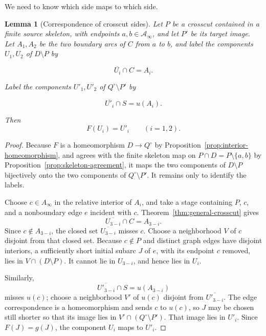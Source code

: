 \documentclass[11pt]{article}
\theoremstyle{mainplain}
\newtheorem{lemma}[theorem]{Lemma}
\theoremstyle{mainroman}
\theoremstyle{definition}
\numberwithin{equation}{section}
\begin{document}
We need to know which side maps to which side.

\begin{lemma}[Correspondence of crosscut sides]\label{lem:crosscut-side-correspondence}
Let \(P\) be a crosscut contained in a finite source skeleton, with endpoints \(a,b\in\mathcal A_\infty\), and let \(P'\) be its target image. Let \(A_1,A_2\) be the two boundary arcs of \(C\) from \(a\) to \(b\), and label the components \(U_1,U_2\) of \(D\setminus P\) by

\[
\overline{U_i}\cap C=A_i.
\]

Label the components \(U'_1,U'_2\) of \(Q^\circ\setminus P'\) by

\[
\overline{U'_i}\cap S=u(A_i).
\]

Then
\[
F(U_i)=U'_i
\qquad(i=1,2).
\]
\end{lemma}
\begin{proof}
Because \(F\) is a homeomorphism \(D\to Q^\circ\) by
Proposition~\ref{prop:interior-homeomorphism}, and agrees with the finite skeleton map on \(P\cap D=P\setminus\{a,b\}\) by Proposition~\ref{prop:skeleton-agreement}, it maps the two components of \(D\setminus P\) bijectively onto the two components of \(Q^\circ\setminus P'\). It remains only to identify the labels.

Choose \(c\in A_\infty\) in the relative interior of \(A_i\), and take
a stage containing \(P\), \(c\), and a nonboundary edge \(e\) incident
with \(c\). Theorem~\ref{thm:general-crosscut} gives
\[
 \overline{U_{3-i}}\cap C=A_{3-i}.
\]
Since \(c\notin A_{3-i}\), the closed set \(\overline{U_{3-i}}\) misses
\(c\). Choose a neighborhood \(V\) of \(c\) disjoint from that closed
set. Because \(c\notin P\) and distinct graph edges have disjoint
interiors, a sufficiently short initial subarc \(J\) of \(e\), with its endpoint
\(c\) removed, lies in \(V\cap(D\setminus P)\). It cannot lie in \(U_{3-i}\), and hence lies
in \(U_i\).

Similarly,
\[
 \overline{U'_{3-i}}\cap S=u(A_{3-i})
\]
misses \(u(c)\); choose a neighborhood \(V'\) of \(u(c)\) disjoint from
\(\overline{U'_{3-i}}\). The edge correspondence is a homeomorphism and
sends \(c\) to \(u(c)\), so \(J\) may be chosen still shorter so that
its image lies in \(V'\cap(Q^\circ\setminus P')\). That image lies in
\(U'_i\). Since \(F(J)=g(J)\), the component \(U_i\) maps to \(U'_i\).
\end{proof}
\end{document}
